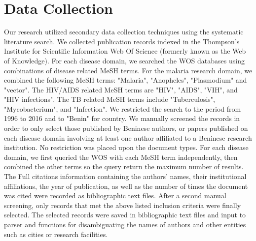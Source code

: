 \section{Data Collection}
\label{sec:data_collection}
Our research utilized secondary data collection techniques using the systematic literature search. We collected publication records indexed in the Thompson's Institute for Scientific Information Web Of Science (formerly known as the Web of Knowledge). %
For each disease domain, we searched the WOS databases using combinations of disease related MeSH terms. For the malaria research domain, we combined the following MeSH terms: "Malaria", "Anopheles", "Plasmodium" and "vector". The HIV/AIDS  related MeSH terms are "HIV", "AIDS", "VIH", and "HIV infections". The TB related MeSH terms include "Tuberculosis", "Mycobacterium", and "Infection". We restricted the search to the period from 1996 to 2016 and to "Benin" for country. We manually screened the records in order to only select those published by Beninese authors, or papers published on each disease domain involving at least one author affiliated to a Beninese research institution. No restriction was placed upon the document types. For each disease domain, we first queried the WOS with each MeSH term independently, then combined the other terms so the query return the maximum number of results. The Full citations information containing the authors' names, their institutional affiliations, the year of publication, as well as the number of times the document was cited were recorded as bibliographic text files. After a second manual screening, only records that met the above listed inclusion criteria were finally selected. The selected records were saved in bibliographic text files and input to parser and functions for disambiguating the names of authors and other entities such as cities or research facilities.

